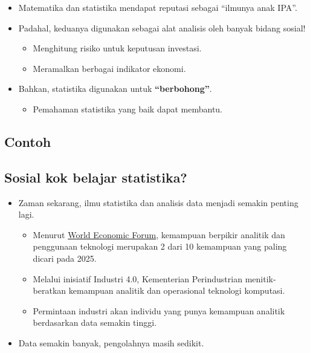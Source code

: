 \documentclass[
  letterpaper,
  DIV=11,
  numbers=noendperiod]{scrartcl}
\providecommand{\tightlist}{%
  \setlength{\itemsep}{0pt}\setlength{\parskip}{0pt}}\usepackage{longtable,booktabs,array}
\begin{document}
\begin{itemize}
\item
  Matematika dan statistika mendapat reputasi sebagai ``ilmunya anak
  IPA''.
\item
  Padahal, keduanya digunakan sebagai alat analisis oleh banyak bidang
  sosial!

  \begin{itemize}
  \item
    Menghitung risiko untuk keputusan investasi.
  \item
    Meramalkan berbagai indikator ekonomi.
  \end{itemize}
\item
  Bahkan, statistika digunakan untuk \textbf{``berbohong''}.

  \begin{itemize}
  \tightlist
  \item
    Pemahaman statistika yang baik dapat membantu.
  \end{itemize}
\end{itemize}

\subsection{Contoh}\label{contoh}

\subsection{Sosial kok belajar
statistika?}\label{sosial-kok-belajar-statistika-1}

\begin{itemize}
\item
  Zaman sekarang, ilmu statistika dan analisis data menjadi semakin
  penting lagi.

  \begin{itemize}
  \item
    Menurut
    \href{https://www.weforum.org/agenda/2020/10/top-10-work-skills-of-tomorrow-how-long-it-takes-to-learn-them/}{World
    Economic Forum}, kemampuan berpikir analitik dan penggunaan
    teknologi merupakan 2 dari 10 kemampuan yang paling dicari pada
    2025.
  \item
    Melalui inisiatif Industri 4.0, Kementerian Perindustrian
    menitik-beratkan kemampuan analitik dan operasional teknologi
    komputasi.
  \item
    Permintaan industri akan individu yang punya kemampuan analitik
    berdasarkan data semakin tinggi.
  \end{itemize}
\item
  Data semakin banyak, pengolahnya masih sedikit.
\end{itemize}
\end{document}
